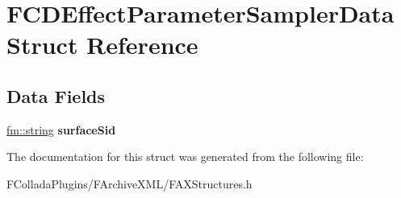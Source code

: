\hypertarget{structFCDEffectParameterSamplerData}{
\section{FCDEffectParameterSamplerData Struct Reference}
\label{structFCDEffectParameterSamplerData}
}
\subsection*{Data Fields}
\begin{DoxyCompactItemize}
\item 
\hypertarget{structFCDEffectParameterSamplerData_af5427cfd6205ecb0a6a54c04fb6bf6c3}{
\hyperlink{classfm_1_1stringT}{fm::string} {\bfseries surfaceSid}}
\label{structFCDEffectParameterSamplerData_af5427cfd6205ecb0a6a54c04fb6bf6c3}

\end{DoxyCompactItemize}


The documentation for this struct was generated from the following file:\begin{DoxyCompactItemize}
\item 
FColladaPlugins/FArchiveXML/FAXStructures.h\end{DoxyCompactItemize}
